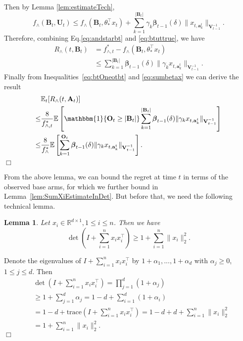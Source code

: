 \documentclass{article}
\newcommand{\bbeta}{\boldsymbol{\beta}}
\newcommand{\EE}{\mathbb{E}}
\newcommand{\RR}{\mathbb{R}}
\newcommand{\bOne}{\mathbbm{1}}
\newcommand{\bA}{\mathbf{A}}
\newcommand{\ba}{\mathbf{a}}
\newcommand{\bB}{\mathbf{B}}
\newcommand{\bO}{\mathbf{O}}
\newcommand{\bU}{\mathbf{U}}
\newcommand{\bV}{\mathbf{V}}
\newcommand{\trace}{\mathrm{trace}}
\newcommand{\abs}[1]{\left| #1 \right|}
\newcommand{\norm}[1]{\| #1 \|}
\newtheorem{lemma}[theorem]{Lemma}%
\newenvironment{proof}{\noindent {\textbf{Proof. }}}{$\Box$ \medskip}
\begin{document}
\begin{proof}
Then by Lemma \ref{lem:estimateTech},
\begin{equation} \label{eq:btuttrue}
f_{\wedge}(\bB_t,\bU_t) \leq f_{\wedge}(\bB_t, \theta_*^{\top}x_t) + \sum_{k=1}^{\abs{\bB_t}}\gamma_k\bbeta_{t-1}(\delta)\norm{x_{t,\ba_k^t}}_{\bV_{t-1}^{-1}}.
\end{equation}
Therefore, combining Eq.\eqref{eq:andstarbt} and \eqref{eq:btuttrue}, we have
\begin{align}
R_{\wedge}(t, \bB_t) & = f_{\wedge, t}^{\ast} - f_{\wedge}(\bB_t, \theta_{\ast}^{\top}x_t) \nonumber \\
& \leq \sum_{k=1}^{\abs{\bB_t}}\bbeta_{t-1}(\delta)\norm{\gamma_k x_{t,\ba_k^t}}_{\bV_{t-1}^{-1}}. \label{eq:sumbetax}
\end{align}
Finally from Inequalities~\eqref{eq:btOneotbt} and \eqref{eq:sumbetax}
we can derive the result
\begin{align*}
&\EE_t[R_{\wedge}(t, \bA_t)] \\
\leq& \frac{8}{f_{\wedge, t}^*} \EE \left[\bOne\{ \bO_t \geq \abs{\bB_t} \}\sum_{k=1}^{\abs{\bB_t}}\bbeta_{t-1}(\delta)\norm{\gamma_k x_{t,\ba_k^t}}_{\bV_{t-1}^{-1}} \right]\\
\leq& \frac{8}{f_{\wedge}^*} \EE \left[ \sum_{k=1}^{ \bO_t } \bbeta_{t-1}(\delta) \norm{\gamma_k x_{t,\ba_k^t}}_{\bV_{t-1}^{-1}} \right].
\end{align*}
\end{proof}

From the above lemma, we can bound the regret at time $t$ in terms of the observed base arms, for which we further bound in Lemma~\ref{lem:SumXiEstimateInDet}.
But before that, we need the following technical lemma.

\begin{lemma}
\label{lem:detTech}
Let $x_i \in \RR^{d \times 1}, 1 \leq i \leq n$. Then we have
$$
\det\left(I + \sum_{i=1}^n x_i x_i^{\top}\right) \geq 1 + \sum_{i=1}^n \norm{x_i}_2^2.
$$
\end{lemma}
\begin{proof}
Denote the eigenvalues of $I + \sum_{i=1}^n x_i x_i^{\top}$ by $1+\alpha_1,...,1+\alpha_d$ with $\alpha_j \geq 0$, $1\leq j\leq d$. Then
\begin{align*}
&\det(I + \sum_{i=1}^n x_i x_i^{\top})= \prod_{j=1}^d (1 + \alpha_j)\\
&\geq 1 +\sum_{j=1}^d \alpha_j =1-d + \sum_{i=1}^d (1+\alpha_i) \\
&=1-d + \trace(I + \sum_{i=1}^n x_i x_i^{\top})= 1-d + d + \sum_{i=1}^n \norm{x_i}_2^2\\
&=1 + \sum_{i=1}^n \norm{x_i}_2^2.
\end{align*}
\end{proof}
\end{document}
